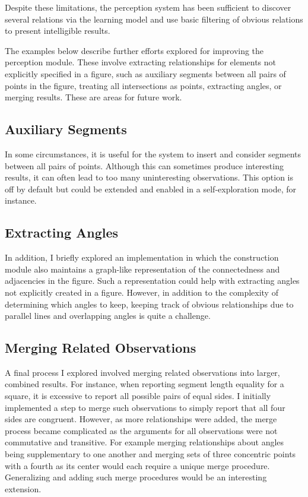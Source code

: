 Despite these limitations, the perception system has been sufficient
to discover several relations via the learning model and use basic
filtering of obvious relations to present intelligible results.

The examples below describe further efforts explored for improving the
perception module. These involve extracting relationships for elements
not explicitly specified in a figure, such as auxiliary segments
between all pairs of points in the figure, treating all intersections
as points, extracting angles, or merging results. These are areas for
future work.

\subsection{Auxiliary Segments}

In some circumstances, it is useful for the system to insert and
consider segments between all pairs of points. Although this can
sometimes produce interesting results, it can often lead to too many
uninteresting observations. This option is off by default but could be
extended and enabled in a self-exploration mode, for instance.

\subsection{Extracting Angles}

In addition, I briefly explored an implementation in which the
construction module also maintains a graph-like representation of the
connectedness and adjacencies in the figure. Such a representation
could help with extracting angles not explicitly created in a
figure. However, in addition to the complexity of determining which
angles to keep, keeping track of obvious relationships due to parallel
lines and overlapping angles is quite a challenge.

\subsection{Merging Related Observations}

A final process I explored involved merging related observations into
larger, combined results. For instance, when reporting segment length
equality for a square, it is excessive to report all possible pairs of
equal sides. I initially implemented a step to merge such observations
to simply report that all four sides are congruent. However, as more
relationships were added, the merge process became complicated as the
arguments for all observations were not commutative and transitive.
For example merging relationships about angles being supplementary to
one another and merging sets of three concentric points with a fourth
as its center would each require a unique merge
procedure. Generalizing and adding such merge procedures would be an
interesting extension.

